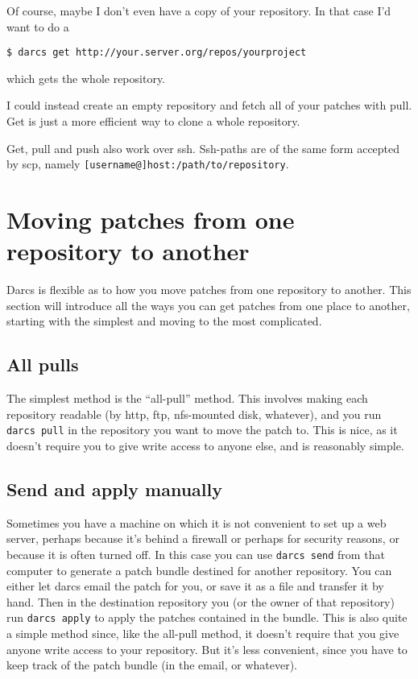 \documentclass{book}
\begin{document}
Of course, maybe I don't even have a copy of your repository.  In that case
I'd want to do a
\begin{verbatim}
$ darcs get http://your.server.org/repos/yourproject
\end{verbatim}
which gets the whole repository.

I could instead create an empty repository and fetch all of your patches
with pull.  Get is just a more efficient way to clone a whole repository.

Get, pull and push also work over ssh.  Ssh-paths are of the same form
accepted by scp, namely \verb|[username@]host:/path/to/repository|.

\section{Moving patches from one repository to another}

Darcs is flexible as to how you move patches from one repository to another.
This section will introduce all the ways you can get patches from one place
to another, starting with the simplest and moving to the most complicated.

\subsection{All pulls}

The simplest method is the ``all-pull'' method.  This involves making each
repository readable (by http, ftp, nfs-mounted disk, whatever), and you
run \verb|darcs pull| in the repository you want to move the patch to.  This is nice,
as it doesn't require you to give write access to anyone else, and is
reasonably simple.

\subsection{Send and apply manually}

Sometimes you have a machine on which it is not convenient to set up a web
server, perhaps because it's behind a firewall or perhaps for security
reasons, or because it is often turned off.  In this case you can use
\verb|darcs send|
from that computer to generate a patch bundle destined for another
repository.  You can either let darcs email the patch for you, or save it
as a file and transfer it by hand.  Then in the destination repository you
(or the owner of that repository) run \verb|darcs apply| to apply the patches contained
in the bundle.  This is also quite a simple method since, like the all-pull
method, it doesn't require that you give anyone write access to your
repository.  But it's less convenient, since you have to keep track of the
patch bundle (in the email, or whatever).
\end{document}
